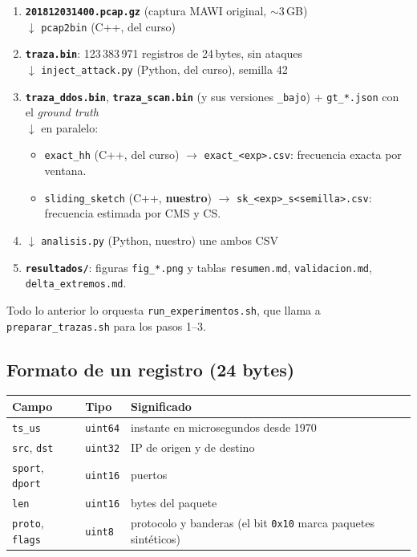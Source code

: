 \documentclass[11pt]{article}
\newcommand{\code}[1]{\texttt{#1}}
\begin{document}
\begin{enumerate}
    \item \textbf{\code{201812031400.pcap.gz}} (captura MAWI original, $\sim$3\,GB) \\
          $\downarrow$ \code{pcap2bin} (C++, del curso)
    \item \textbf{\code{traza.bin}}: 123\,383\,971 registros de 24\,bytes, sin ataques \\
          $\downarrow$ \code{inject\_attack.py} (Python, del curso), semilla 42
    \item \textbf{\code{traza\_ddos.bin}}, \textbf{\code{traza\_scan.bin}} (y sus versiones \code{\_bajo}) + \code{gt\_*.json} con el \emph{ground truth} \\
          $\downarrow$ en paralelo:
    \begin{itemize}
        \item \code{exact\_hh} (C++, del curso) $\rightarrow$ \code{exact\_<exp>.csv}: frecuencia exacta por ventana.
        \item \code{sliding\_sketch} (C++, \textbf{nuestro}) $\rightarrow$ \code{sk\_<exp>\_s<semilla>.csv}: frecuencia estimada por CMS y CS.
    \end{itemize}
    \item $\downarrow$ \code{analisis.py} (Python, nuestro) une ambos CSV
    \item \textbf{\code{resultados/}}: figuras \code{fig\_*.png} y tablas \code{resumen.md}, \code{validacion.md}, \code{delta\_extremos.md}.
\end{enumerate}

Todo lo anterior lo orquesta \code{run\_experimentos.sh}, que llama a \code{preparar\_trazas.sh} para los pasos 1–3.

\subsection*{Formato de un registro (24 bytes)}

\begin{center}
\begin{tabular}{lll}
\toprule
Campo & Tipo & Significado \\
\midrule
\code{ts\_us} & \code{uint64} & instante en microsegundos desde 1970 \\
\code{src}, \code{dst} & \code{uint32} & IP de origen y de destino \\
\code{sport}, \code{dport} & \code{uint16} & puertos \\
\code{len} & \code{uint16} & bytes del paquete \\
\code{proto}, \code{flags} & \code{uint8} & protocolo y banderas (el bit \code{0x10} marca paquetes sintéticos) \\
\bottomrule
\end{tabular}
\end{center}
\end{document}
